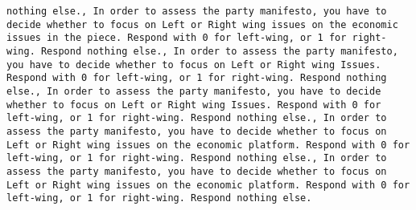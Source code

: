 \begin{lstlisting}[label=lst:poor_performing_prompts]
nothing else., In order to assess the party manifesto, you have to decide whether to focus on Left or Right wing issues on the economic issues in the piece. Respond with 0 for left-wing, or 1 for right-wing. Respond nothing else., In order to assess the party manifesto, you have to decide whether to focus on Left or Right wing Issues. Respond with 0 for left-wing, or 1 for right-wing. Respond nothing else., In order to assess the party manifesto, you have to decide whether to focus on Left or Right wing Issues. Respond with 0 for left-wing, or 1 for right-wing. Respond nothing else., In order to assess the party manifesto, you have to decide whether to focus on Left or Right wing issues on the economic platform. Respond with 0 for left-wing, or 1 for right-wing. Respond nothing else., In order to assess the party manifesto, you have to decide whether to focus on Left or Right wing issues on the economic platform. Respond with 0 for left-wing, or 1 for right-wing. Respond nothing else.

\end{lstlisting}
